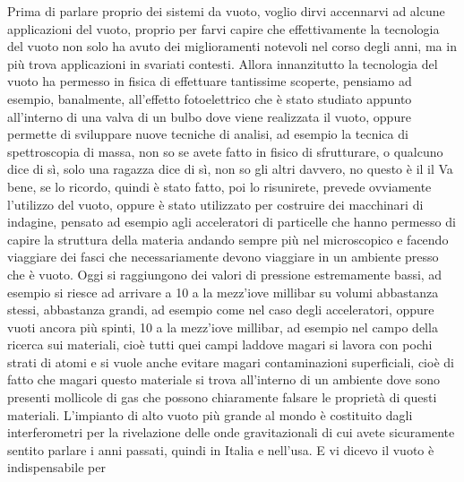 Prima di parlare proprio dei sistemi da vuoto, voglio dirvi accennarvi ad alcune applicazioni del vuoto, proprio per farvi capire che effettivamente la tecnologia del vuoto non solo ha avuto dei miglioramenti notevoli nel corso degli anni, ma in più trova applicazioni in svariati contesti. Allora innanzitutto la tecnologia del vuoto ha permesso in fisica di effettuare tantissime scoperte, pensiamo ad esempio, banalmente, all'effetto fotoelettrico che è stato studiato appunto all'interno di una valva di un bulbo dove viene realizzata il vuoto, oppure permette di sviluppare nuove tecniche di analisi, ad esempio la tecnica di spettroscopia di massa, non so se avete fatto in fisico di sfrutturare, o qualcuno dice di sì, solo una ragazza dice di sì, non so gli altri davvero, no questo è il il Va bene, se lo ricordo, quindi è stato fatto, poi lo risunirete, prevede ovviamente l'utilizzo del vuoto, oppure è stato utilizzato per costruire dei macchinari di indagine, pensato ad esempio agli acceleratori di particelle che hanno permesso di capire la struttura della materia andando sempre più nel microscopico e facendo viaggiare dei fasci che necessariamente devono viaggiare in un ambiente presso che è vuoto. Oggi si raggiungono dei valori di pressione estremamente bassi, ad esempio si riesce ad arrivare a 10 a la mezz'iove millibar su volumi abbastanza stessi, abbastanza grandi, ad esempio come nel caso degli acceleratori, oppure vuoti ancora più spinti, 10 a la mezz'iove millibar, ad esempio nel campo della ricerca sui materiali, cioè tutti quei campi laddove magari si lavora con pochi strati di atomi e si vuole anche evitare magari contaminazioni superficiali, cioè di fatto che magari questo materiale si trova all'interno di un ambiente dove sono presenti mollicole di gas che possono chiaramente falsare le proprietà di questi materiali. L'impianto di alto vuoto più grande al mondo è costituito dagli interferometri per la rivelazione delle onde gravitazionali di cui avete sicuramente sentito parlare i anni passati, quindi in Italia e nell'usa. E vi dicevo il vuoto è indispensabile per 

